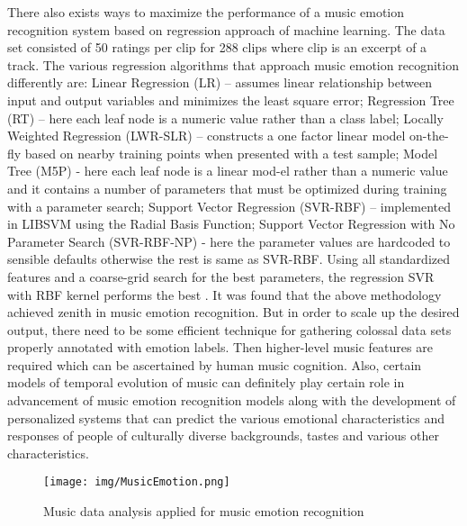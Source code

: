 \documentclass{proc}
\begin{document}
There also exists ways to maximize the performance of a music emotion recognition system based on regression approach of machine learning. The data set consisted of 50 ratings per clip for 288 clips where clip is an excerpt of a track. The various regression algorithms that approach music emotion recognition differently are: Linear Regression (LR) – assumes linear relationship between input and output variables and minimizes the least square error; Regression Tree (RT) – here each leaf node is a numeric value rather than a class label; Locally Weighted Regression (LWR-SLR) – constructs a one factor linear model on-the-fly based on nearby training points when presented with a test sample; Model Tree (M5P) - here each leaf node is a linear mod-el rather than a numeric value and it contains a number of parameters that must be optimized during training with a parameter search; Support Vector Regression (SVR-RBF) – implemented in LIBSVM using the Radial Basis Function; Support Vector Regression with No Parameter Search (SVR-RBF-NP) -  here the parameter values are hardcoded to sensible defaults otherwise the rest is same as SVR-RBF. Using all standardized features and a coarse-grid search for the best parameters, the regression SVR with RBF kernel performs the best \cite{Huq2010}. It was found that the above methodology achieved zenith in music emotion recognition. But in order to scale up the desired output, there need to be some efficient technique for gathering colossal data sets properly annotated with emotion labels. Then higher-level music features are required which can be ascertained by human music cognition. Also, certain models of temporal evolution of music can definitely play certain role in advancement of music emotion recognition models along with the development of personalized systems that can predict the various emotional characteristics and responses of people of culturally diverse backgrounds, tastes and various other characteristics.
\begin{figure}
	\centering
		\texttt{[image: img/MusicEmotion.png]}
	\caption{Music data analysis applied for music emotion recognition}
	\label{fig:Music Emotion}
\end{figure}
\end{document}
